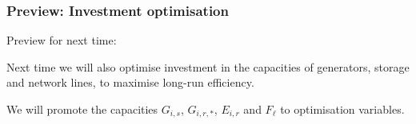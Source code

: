 \documentclass[10pt,dvipsnames]{beamer}
\begin{document}
\begin{frame}[fragile]
  \frametitle{Preview: Investment optimisation}

  Preview for next time:

  Next time we will also optimise \alert{investment} in the \alert{capacities} of generators,
  storage and network lines, to maximise \alert{long-run efficiency}.

  We will promote the capacities $G_{i,s}$, $G_{i,r,*}$, $E_{i,r}$ and
  $F_{\ell}$ to optimisation variables.

\end{frame}
\end{document}
